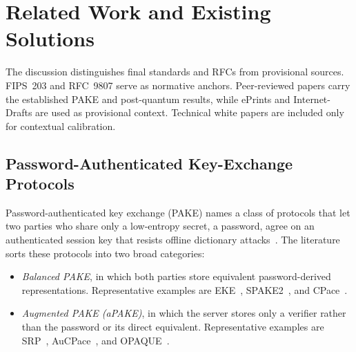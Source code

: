 \documentclass[preprint,12pt]{elsarticle}
\theoremstyle{remark}
\begin{document}
\section{Related Work and Existing Solutions}

The discussion distinguishes final standards and RFCs from provisional sources.
FIPS~203 and RFC~9807 serve as normative anchors. Peer-reviewed papers carry
the established PAKE and post-quantum results, while ePrints and Internet-Drafts
are used as provisional context. Technical white papers are included only for
contextual calibration.

\subsection{Password-Authenticated Key-Exchange Protocols}

Password-authenticated key exchange (PAKE) names a class of protocols that
let two parties who share only a low-entropy secret, a password, agree on
an authenticated session key that resists offline dictionary
attacks~\cite{boyko2000}. The literature sorts these protocols into two
broad categories:

\begin{itemize}
  \item \emph{Balanced PAKE}, in which both parties store equivalent
        password-derived representations. Representative examples are
        EKE~\cite{bellovin1992}, SPAKE2~\cite{ladd2023}, and
        CPace~\cite{haase2019}.
  \item \emph{Augmented PAKE (aPAKE)}, in which the server stores only a
        verifier rather than the password or its direct equivalent.
        Representative examples are SRP~\cite{wu1998},
        AuCPace~\cite{haase2019}, and OPAQUE~\cite{jarecki2018}.
\end{itemize}
\end{document}
